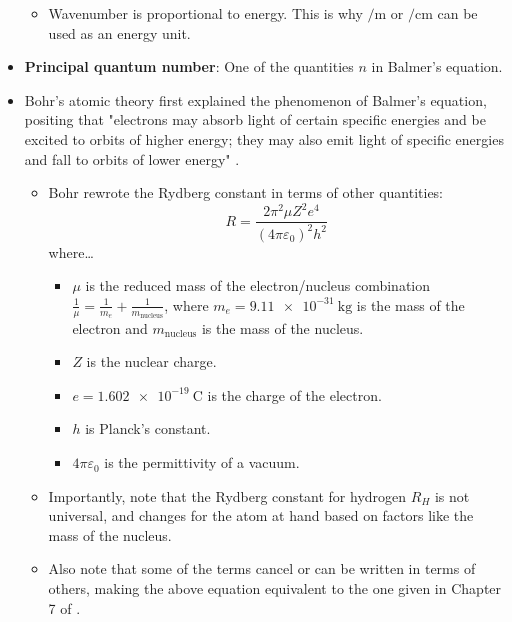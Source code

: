 \documentclass[../notes.tex]{subfiles}
\begin{document}
\begin{itemize}
    \begin{itemize}
        \item Wavenumber is proportional to energy. This is why $\si{\per\meter}$ or $\si{\per\centi\meter}$ can be used as an energy unit.
    \end{itemize}
    \item \textbf{Principal quantum number}: One of the quantities $n$ in Balmer's equation.
    \item Bohr's atomic theory first explained the phenomenon of Balmer's equation, positing that "electrons may absorb light of certain specific energies and be excited to orbits of higher energy; they may also emit light of specific energies and fall to orbits of lower energy" \parencite[11-12]{bib:MiesslerFischerTarr}.
    \begin{itemize}
        \item Bohr rewrote the Rydberg constant in terms of other quantities:
        \begin{equation*}
            R = \frac{2\pi^2\mu Z^2e^4}{(4\pi\varepsilon_0)^2h^2}
        \end{equation*}
        where\dots
        \begin{itemize}
            \item $\mu$ is the reduced mass of the electron/nucleus combination $\frac{1}{\mu}=\frac{1}{m_e}+\frac{1}{m_\text{nucleus}}$, where $m_e=\SI{9.11e-31}{\kilo\gram}$ is the mass of the electron and $m_\text{nucleus}$ is the mass of the nucleus.
            \item $Z$ is the nuclear charge.
            \item $e=\SI{1.602e-19}{\coulomb}$ is the charge of the electron.
            \item $h$ is Planck's constant.
            \item $4\pi\varepsilon_0$ is the permittivity of a vacuum.
        \end{itemize}
        \item Importantly, note that the Rydberg constant for hydrogen $R_H$ is not universal, and changes for the atom at hand based on factors like the mass of the nucleus.
        \item Also note that some of the terms cancel or can be written in terms of others, making the above equation equivalent to the one given in Chapter 7 of \textcite{bib:APChemNotes}.
    \end{itemize}
    \begin{figure}[h!]
        \centering
\end{figure}
\end{itemize}
\end{document}
